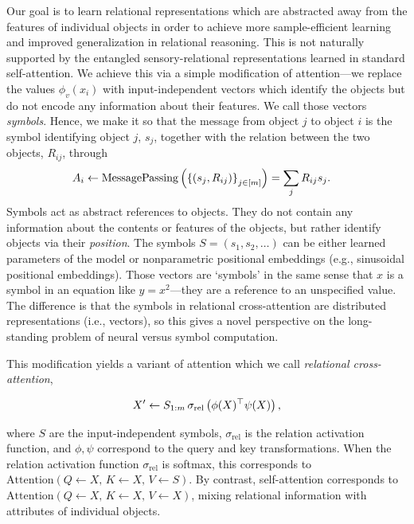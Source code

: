 Our goal is to learn relational representations which are abstracted away from the features of individual objects in order to achieve more sample-efficient learning and improved generalization in relational reasoning. This is not naturally supported by the entangled sensory-relational representations learned in standard self-attention. We achieve this via a simple modification of attention---we replace the values $\phi_v(x_i)$ with input-independent vectors which identify the objects but do not encode any information about their features. We call those vectors \textit{symbols}. Hence, we make it so that the message from object $j$ to object $i$ is the symbol identifying object $j$, $s_j$, together with the relation between the two objects, $R_{ij}$, through
\begin{equation}\label{eq:relational_crossattn_message_passing}
    \begin{split}
        A_i &\gets \mathrm{MessagePassing}\paren{\set{(s_j, R_{ij})}_{j \in [\m]}}%
        = \sum_{j} R_{ij} s_j.
    \end{split}
\end{equation}
Symbols act as abstract references to objects. They do not contain any information about the contents or features of the objects, but rather identify objects via their \textit{position}. The symbols $S = (s_1, s_2, \ldots)$ can be either learned parameters of the model or nonparametric positional embeddings (e.g., sinusoidal positional embeddings). Those vectors are `symbols' in the same sense that $x$ is a symbol in an equation like $y = x^2$---they are a reference to an unspecified value. The difference is that the symbols in relational cross-attention are distributed representations (i.e., vectors), so this gives a novel perspective on the long-standing problem of neural versus symbol computation.

This modification yields a variant of attention which we call \textit{relational cross-attention},

\begin{equation}\label{eq:relational_crossattn}
    X' \gets S_{1:m} \, \sigma_{\mathrm{rel}}\left(\phi(X)^\top \psi(X)\right),
\end{equation}

where $S$ are the input-independent symbols, $\sigma_{\mathrm{rel}}$ is the relation activation function, and $\phi, \psi$ correspond to the query and key transformations. When the relation activation function $\sigma_{\mathrm{rel}}$ is softmax, this corresponds to $\mathrm{Attention}(Q \gets X,\, K \gets X,\, V \gets S)$. By contrast, self-attention corresponds to $\mathrm{Attention}(Q \gets X,\, K \gets X,\, V \gets X)$, mixing relational information with attributes of individual objects.

